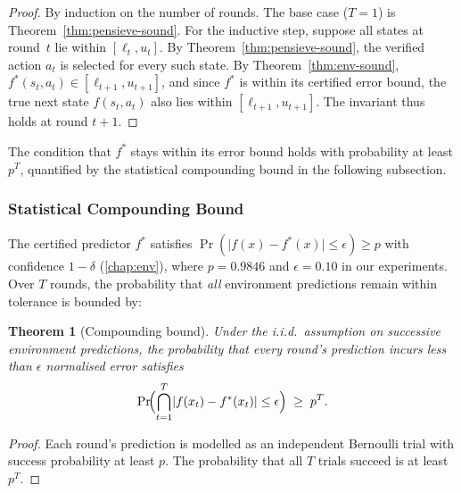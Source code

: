\documentclass[thesis]{uofithesis} %
\newtheorem{theorem}{Theorem}[section]
\begin{document}
    \begin{proof}
    By induction on the number of rounds.  The base case ($T = 1$) is
    Theorem~\ref{thm:pensieve-sound}.  For the inductive step, suppose
    all states at round~$t$ lie within $[\ell_t, u_t]$.  By
    Theorem~\ref{thm:pensieve-sound}, the verified action $a_t$ is
    selected for every such state.  By Theorem~\ref{thm:env-sound},
    $f^{\ast}(s_t, a_t) \in [\ell_{t+1}, u_{t+1}]$, and since
    $f^{\ast}$ is within its certified error bound, the true next
    state $f(s_t, a_t)$ also lies within $[\ell_{t+1}, u_{t+1}]$.
    The invariant thus holds at round $t{+}1$.
    \end{proof}

    The condition that $f^{\ast}$ stays within its error bound holds
    with probability at least $p^T$, quantified by the statistical
    compounding bound in the following subsection.


    \subsubsection{Statistical Compounding Bound}
    \label{sec:verify-compounding}

    The certified predictor $f^{\ast}$ satisfies
    $\Pr(\lvert f(x) - f^{\ast}(x) \rvert \leq \epsilon) \geq p$
    with confidence $1 - \delta$ (\ref{chap:env}), where
    $p = 0.9846$ and $\epsilon = 0.10$ in our experiments.  Over $T$
    rounds, the probability that \emph{all} environment predictions remain
    within tolerance is bounded by:

    \begin{theorem}[Compounding bound]
    \label{thm:compounding}
    Under the i.i.d.\ assumption on successive environment predictions,
    the probability that every round's prediction incurs less than
    $\epsilon$ normalised error satisfies
    \begin{equation}
        \Pr\!\Bigl(\bigcap_{t=1}^{T}
            \lvert f(x_t) - f^{\ast}(x_t) \rvert \leq \epsilon\Bigr)
        \;\geq\; p^T.
        \label{eq:compounding}
    \end{equation}
    \end{theorem}

    \begin{proof}
    Each round's prediction is modelled as an independent Bernoulli trial
    with success probability at least $p$.  The probability that all $T$
    trials succeed is at least $p^T$.
    \end{proof}
\end{document}
